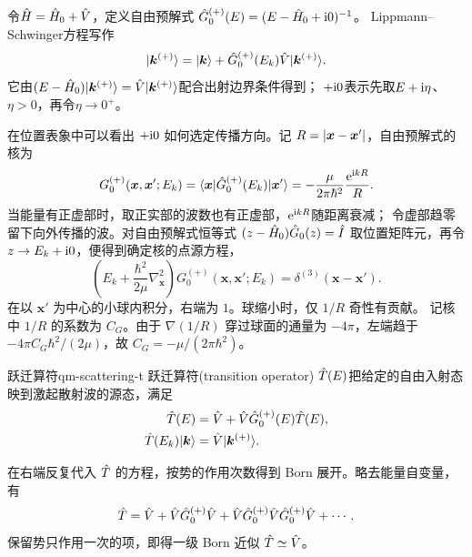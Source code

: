 令$\hat{H} = \hat{H}_0 + \hat{V}$，定义自由预解式
$\hat{G}_0^{(+)}(E) = (E - \hat{H}_0 + \mathrm{i}0)^{-1}$。
Lippmann--Schwinger方程写作
\begin{equation}
    \lvert\bm k^{(+)}\rangle = \lvert\bm k\rangle + \hat{G}_0^{(+)}(E_k)\hat{V}\lvert\bm k^{(+)}\rangle.
\end{equation}
它由$(E - \hat{H}_0)\lvert\bm k^{(+)}\rangle = \hat{V}\lvert\bm k^{(+)}\rangle$配合出射边界条件得到；
$+\mathrm{i}0$表示先取$E + \mathrm{i}\eta$、$\eta > 0$，再令$\eta \to 0^+$。

在位置表象中可以看出 $+\mathrm{i}0$ 如何选定传播方向。记 $R = \lvert\bm x - \bm x'\rvert$，自由预解式的核为
\begin{equation}
    G_0^{(+)}(\bm x,\bm x';E_k) = \langle\bm x\vert\hat{G}_0^{(+)}(E_k)\vert\bm x'\rangle
    = -\frac{\mu}{2\pi\hbar^2}\frac{\mathop{}\!\mathrm{e}^{\mathrm{i} kR}}{R}.
\end{equation}
当能量有正虚部时，取正实部的波数也有正虚部，$\mathop{}\!\mathrm{e}^{\mathrm{i} kR}$随距离衰减；
令虚部趋零留下向外传播的波。对自由预解式恒等式 $(z - \hat{H}_0)\hat{G}_0(z) = \hat{I}$ 取位置矩阵元，再令 $z \to E_k + \mathrm{i}0$，便得到确定核的点源方程，
\begin{equation}
    \left(E_k + \frac{\hbar^2}{2\mu}\nabla_{\bm x}^2\right)
        G_0^{(+)}(\bm x,\bm x';E_k) = \delta^{(3)}(\bm x - \bm x').
\end{equation}
在以 $\bm x'$ 为中心的小球内积分，右端为 $1$。球缩小时，仅 $1/R$ 奇性有贡献。
记核中 $1/R$ 的系数为 $C_G$。由于 $\nabla(1/R)$ 穿过球面的通量为 $-4\pi$，左端趋于 $-4\pi C_G\hbar^2/(2\mu)$，故 $C_G = -\mu/(2\pi\hbar^2)$。
\begin{definition}{跃迁算符}{qm-scattering-t}
    跃迁算符(transition operator) $\hat{T}(E)$把给定的自由入射态映到激起散射波的源态，满足
    \begin{subequations}
        \begin{align}
            \hat{T}(E) &= \hat{V} + \hat{V}\hat{G}_0^{(+)}(E)\hat{T}(E),\\
            \hat{T}(E_k)\lvert\bm k\rangle &= \hat{V}\lvert\bm k^{(+)}\rangle.
        \end{align}
    \end{subequations}
\end{definition}
在右端反复代入 $\hat{T}$ 的方程，按势的作用次数得到 Born 展开。略去能量自变量，有
\begin{equation}
    \hat{T} = \hat{V} + \hat{V}\hat{G}_0^{(+)}\hat{V}
        + \hat{V}\hat{G}_0^{(+)}\hat{V}\hat{G}_0^{(+)}\hat{V} + \cdots .
    \label{eq:born-scattering-series}
\end{equation}
保留势只作用一次的项，即得一级 Born 近似 $\hat{T} \simeq \hat{V}$。

